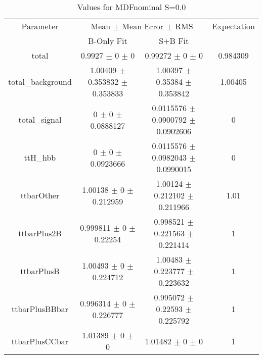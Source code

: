 \begin{table}
\centering
\caption{Values for MDFnominal S=0.0}
\begin{tabular}{cccc}
\toprule
Parameter & \multicolumn{2}{c}{Mean $\pm$ Mean Error $\pm$ RMS} & Expectation\\
 & B-Only Fit & S+B Fit & \\
\midrule
total & \num{0.9927} $\pm$ \num{0} $\pm$ \num{0} & \num{0.99272} $\pm$ \num{0} $\pm$ \num{0} & \num{0.984309}\\
total\_background & \num{1.00409} $\pm$ \num{0.353832} $\pm$ \num{0.353833} & \num{1.00397} $\pm$ \num{0.35384} $\pm$ \num{0.353842} & \num{1.00405}\\
total\_signal & \num{0} $\pm$ \num{0} $\pm$ \num{0.0888127} & \num{0.0115576} $\pm$ \num{0.0900792} $\pm$ \num{0.0902606} & \num{0}\\
ttH\_hbb & \num{0} $\pm$ \num{0} $\pm$ \num{0.0923666} & \num{0.0115576} $\pm$ \num{0.0982043} $\pm$ \num{0.0990015} & \num{0}\\
ttbarOther & \num{1.00138} $\pm$ \num{0} $\pm$ \num{0.212959} & \num{1.00124} $\pm$ \num{0.212102} $\pm$ \num{0.211966} & \num{1.01}\\
ttbarPlus2B & \num{0.999811} $\pm$ \num{0} $\pm$ \num{0.22254} & \num{0.998521} $\pm$ \num{0.221563} $\pm$ \num{0.221414} & \num{1}\\
ttbarPlusB & \num{1.00493} $\pm$ \num{0} $\pm$ \num{0.224712} & \num{1.00483} $\pm$ \num{0.223777} $\pm$ \num{0.223632} & \num{1}\\
ttbarPlusBBbar & \num{0.996314} $\pm$ \num{0} $\pm$ \num{0.226777} & \num{0.995072} $\pm$ \num{0.22593} $\pm$ \num{0.225792} & \num{1}\\
ttbarPlusCCbar & \num{1.01389} $\pm$ \num{0} $\pm$ \num{0} & \num{1.01482} $\pm$ \num{0} $\pm$ \num{0} & \num{1}\\
\bottomrule
\end{tabular}
\end{table}